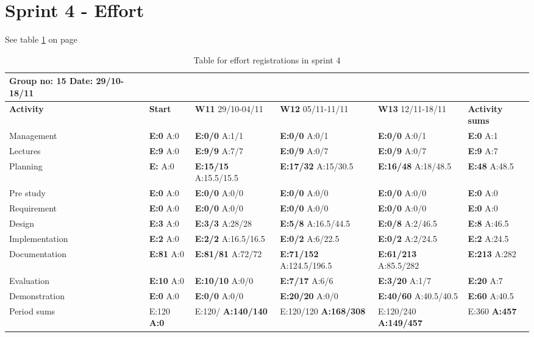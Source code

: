\section{Sprint 4 - Effort}

See table \ref{tab:effortweekss4} on page \pageref{tab:effortweekss4}

\begin{table}[htb]
\begin{tabularx}{\linewidth}{>{\setlength\hsize{.625\hsize}}X|>{\setlength\hsize{0.3\hsize}}X|>{\setlength\hsize{0.5\hsize}}X|>{\setlength\hsize{0.5\hsize}}X|>{\setlength\hsize{0.5\hsize}}X|>{\setlength\hsize{.3\hsize}}X}
Group no: 15 Date: 29/10-18/11  \\ \hline
\textbf{Activity} & \textbf{Start} & \textbf{W11} 29/10-04/11 & \textbf{W12} 05/11-11/11 & \textbf{W13} 12/11-18/11 & \textbf{Activity sums} \\ \hline \hline
Management & \textbf{E:0} A:0 & \textbf{E:0/0} A:1/1 & \textbf{E:0/0} A:0/1 & \textbf{E:0/0} A:0/1 & \textbf{E:0} A:1  \\ \hline
Lectures & \textbf{E:9} A:0 & \textbf{E:9/9} A:7/7 & \textbf{E:0/9} A:0/7 & \textbf{E:0/9} A:0/7 & \textbf{E:9} A:7  \\ \hline
Planning & \textbf{E:} A:0 & \textbf{E:15/15} A:15.5/15.5 & \textbf{E:17/32} A:15/30.5 & \textbf{E:16/48} A:18/48.5 & \textbf{E:48} A:48.5  \\ \hline
Pre study & \textbf{E:0} A:0 & \textbf{E:0/0} A:0/0 & \textbf{E:0/0} A:0/0 & \textbf{E:0/0} A:0/0 & \textbf{E:0} A:0  \\ \hline
Requirement & \textbf{E:0} A:0 & \textbf{E:0/0} A:0/0 & \textbf{E:0/0} A:0/0 & \textbf{E:0/0} A:0/0 & \textbf{E:0} A:0 \\ \hline
Design & \textbf{E:3} A:0 & \textbf{E:3/3} A:28/28 & \textbf{E:5/8} A:16.5/44.5 & \textbf{E:0/8} A:2/46.5 & \textbf{E:8} A:46.5  \\ \hline
Implementation & \textbf{E:2} A:0 & \textbf{E:2/2} A:16.5/16.5 & \textbf{E:0/2} A:6/22.5 & \textbf{E:0/2} A:2/24.5 & \textbf{E:2} A:24.5  \\ \hline
Documentation & \textbf{E:81} A:0 & \textbf{E:81/81} A:72/72 & \textbf{E:71/152} A:124.5/196.5 & \textbf{E:61/213} A:85.5/282 & \textbf{E:213} A:282  \\ \hline
Evaluation & \textbf{E:10} A:0 & \textbf{E:10/10} A:0/0 & \textbf{E:7/17} A:6/6 & \textbf{E:3/20} A:1/7 & \textbf{E:20 } A:7  \\ \hline
Demonstration & \textbf{E:0} A:0 & \textbf{E:0/0} A:0/0 & \textbf{E:20/20} A:0/0 & \textbf{E:40/60} A:40.5/40.5 & \textbf{E:60 } A:40.5  \\ \hline
Period sums & E:120 \textbf{A:0} & E:120/ \textbf{A:140/140} & E:120/120 \textbf{A:168/308} & E:120/240 \textbf{A:149/457} & E:360 \textbf{A:457} \\ \hline
\end{tabularx}

\caption{Table for effort registrations in sprint 4} \label{tab:effortweekss4}
\end{table}

